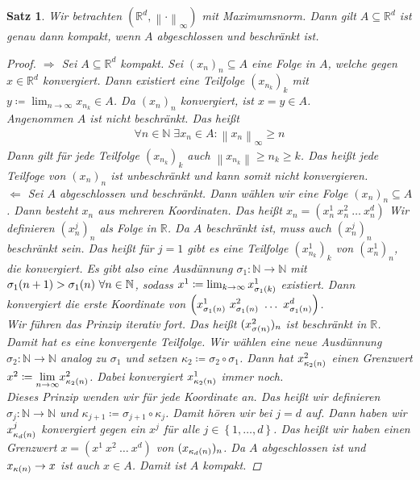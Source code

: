 \documentclass[11pt, twoside, a4paper]{article}
\theoremstyle{plain}
\newtheorem{satz}[blockelement]{Satz}
\numberwithin{equation}{subsection}
\newcommand{\set}[1]{\left\{#1\right\}}
\newcommand{\pair}[1]{\left(#1\right)}
\newcommand{\of}[1]{\mathopen{}\mathclose{}\bgroup\left(#1\aftergroup\egroup\right)}
\newcommand{\norm}[1]{\left\lVert#1\right\rVert}
\newcommand{\impl}[0]{\Rightarrow{}}
\newcommand{\fromto}{\rightarrow{}}
\newcommand{\ntoinf}[0]{n\fromto\infty}
\newcommand{\toinf}{\fromto\infty}
\newcommand{\ex}{\;\exists}
\newcommand{\biglim}[1]{{\displaystyle \lim_{#1}}}
\newcommand{\anf}[1]{\glqq{}#1\grqq}
\newcommand{\R}{\mathbb{R}}
\newcommand{\N}{\mathbb{N}}
\begin{document}
    \begin{satz}
        Wir betrachten $\pair{\R^d, \norm{\cdot}_{\infty}}$ mit Maximumsnorm. Dann gilt $A\subseteq \R^d$ ist genau dann kompakt, wenn $A$ abgeschlossen und beschränkt ist.
        \begin{proof}
            \anf{$\impl$} Sei $A\subseteq\R^d$ kompakt. Sei $(x_n)_n \subseteq A$ eine Folge in $A$, welche gegen $x\in\R^d$ konvergiert. Dann existiert eine Teilfolge $(x_{n_k})_k$ mit $y\coloneqq \lim_{\ntoinf} x_{n_k}\in A$. Da $(x_n)_n$ konvergiert, ist $x=y\in A$.\\
            Angenommen $A$ ist nicht beschränkt. Das heißt
            \begin{align*}
                \forall n\in\N\ex x_n\in A\colon \norm{x_n}_{\infty} \geq n
            \end{align*}
            Dann gilt für jede Teilfolge $(x_{n_k})_k$ auch $\norm{x_{n_k}} \geq n_k \geq k$. Das heißt jede Teilfoge von $(x_n)_n$ ist unbeschränkt und kann somit nicht konvergieren.\\[.5\baselineskip]
            \anf{$\Leftarrow$} Sei $A$ abgeschlossen und beschränkt. Dann wählen wir eine Folge $(x_n)_n\subseteq A$. Dann besteht $x_n$ aus mehreren Koordinaten. Das heißt $x_n = \pair{x_n^1~x_n^2~\dots~x_n^d}$ Wir definieren $(x_n^j)_n$ als Folge in $\R$. Da $A$ beschränkt ist, muss auch $(x_n^j)_n$ beschränkt sein. Das heißt für $j=1$ gibt es eine Teilfolge $(x_{n_k}^1)_k$ von $(x_n^1)_n$, die konvergiert. Es gibt also eine Ausdünnung $\sigma_1: \N\fromto\N$ mit $\sigma_1\of{n+1} > \sigma_1\of{n}~\forall n\in\N$, sodass $x^1\coloneqq \lim_{k\toinf} x_{\sigma_{1}\of{k}}^1$ existiert. Dann konvergiert die erste Koordinate von $\pair{x_{\sigma_1\of{n}}^1~x_{\sigma_1\of{n}}^2~\ldots~x_{\sigma_1\of{n}}^d}$.\\
            Wir führen das Prinzip iterativ fort. Das heißt $(x_{\sigma\of{n}}^2)_n$ ist beschränkt in $\R$. Damit hat es eine konvergente Teilfolge. Wir wählen eine neue Ausdünnung $\sigma_2: \N\fromto\N$ analog zu $\sigma_1$ und setzen $\kappa_2 \coloneqq \sigma_2 \circ \sigma_1$. Dann hat $x^2_{\kappa_2\of{n}}$ einen Grenzwert $x^2\coloneqq \biglim{\ntoinf} x^2_{\kappa_2\of{n}}$. Dabei konvergiert $x_{\kappa_2\of{n}}^1$ immer noch.\\
            Dieses Prinzip wenden wir für jede Koordinate an. Das heißt wir definieren $\sigma_j: \N\fromto\N$ und $\kappa_{j+1} \coloneqq \sigma_{j+1} \circ \kappa_j$. Damit hören wir bei $j=d$ auf. Dann haben wir $x_{\kappa_d\of{n}}^j$ konvergiert gegen ein $x^j$ für alle $j\in\set{1, \ldots, d}$. Das heißt wir haben einen Grenzwert $x=\pair{x^1~x^2~\dots~x^d}$ von $(x_{\kappa_d\of{n}})_n$. Da $A$ abgeschlossen ist und $x_{\kappa\of{n}} \fromto x$ ist auch $x\in A$. Damit ist $A$ kompakt.
        \end{proof}
    \end{satz}
\end{document}
